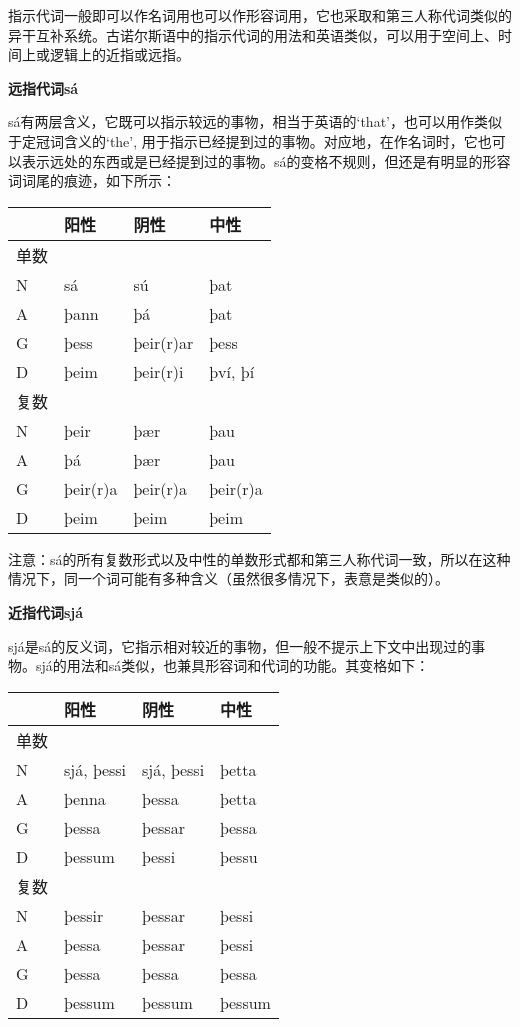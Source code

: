 指示代词一般即可以作名词用也可以作形容词用，它也采取和第三人称代词类似的异干互补系统。古诺尔斯语中的指示代词的用法和英语类似，可以用于空间上、时间上或逻辑上的近指或远指。

\textbf{远指代词sá}

sá有两层含义，它既可以指示较远的事物，相当于英语的`that‌'，也可以用作类似于定冠词含义的`the‌',
用于指示已经提到过的事物。对应地，在作名词时，它也可以表示远处的东西或是已经提到过的事物。sá的变格不规则，但还是有明显的形容词词尾的痕迹，如下所示：

\begin{longtable}{llll}
  \toprule
       & 阳性     & 阴性      & 中性     \\
  \midrule
  \endhead
  \bottomrule
  \endfoot
  单数 &          &           &          \\
  N    & sá       & sú        & þat      \\
  A    & þann     & þá        & þat      \\
  G    & þess     & þeir(r)ar & þess     \\
  D    & þeim     & þeir(r)i  & því, þí  \\
  复数 &          &           &          \\
  N    & þeir     & þær       & þau      \\
  A    & þá       & þær       & þau      \\
  G    & þeir(r)a & þeir(r)a  & þeir(r)a \\
  D    & þeim     & þeim      & þeim     \\
\end{longtable}

注意：sá的所有复数形式以及中性的单数形式都和第三人称代词一致，所以在这种情况下，同一个词可能有多种含义（虽然很多情况下，表意是类似的）。

\textbf{近指代词sjá}

sjá是sá的反义词，它指示相对较近的事物，但一般不提示上下文中出现过的事物。sjá的用法和sá类似，也兼具形容词和代词的功能。其变格如下：

\begin{longtable}{llll}
  \toprule
       & 阳性       & 阴性       & 中性   \\
  \midrule
  \endhead
  \bottomrule
  \endfoot
  单数 &            &            &        \\
  N    & sjá, þessi & sjá, þessi & þetta  \\
  A    & þenna      & þessa      & þetta  \\
  G    & þessa      & þessar     & þessa  \\
  D    & þessum     & þessi      & þessu  \\
  复数 &            &            &        \\
  N    & þessir     & þessar     & þessi  \\
  A    & þessa      & þessar     & þessi  \\
  G    & þessa      & þessa      & þessa  \\
  D    & þessum     & þessum     & þessum \\
\end{longtable}

